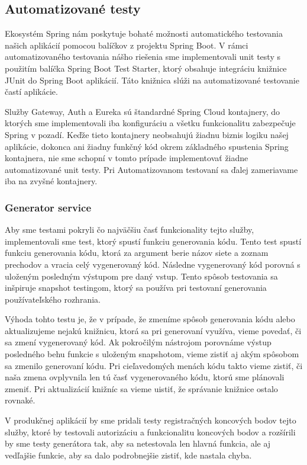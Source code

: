 \subsection{Automatizované testy}

Ekosystém Spring nám poskytuje bohaté možnosti automatického testovania našich aplikácií pomocou balíčkov z projektu Spring Boot. V rámci automatizovaného testovania nášho riešenia sme implementovali unit testy s použitím balíčka Spring Boot Test Starter, ktorý obsahuje integráciu knižnice JUnit do Spring Boot aplikácií. Táto knižnica slúži na automatizované testovanie častí aplikácie. 

Služby Gateway, Auth a Eureka sú štandardné Spring Cloud kontajnery, do ktorých sme implementovali iba konfiguráciu a všetku funkcionalitu zabezpečuje Spring v pozadí. Keďže tieto kontajnery neobsahujú žiadnu biznis logiku našej aplikácie, dokonca ani žiadny funkčný kód okrem základného spustenia Spring kontajnera, nie sme schopní v tomto prípade implementovať žiadne automatizované unit testy. Pri Automatizovanom testovaní sa ďalej zameriavame iba na zvyšné kontajnery.


\subsubsection{Generator service}
Aby sme testami pokryli čo najväčšiu časť funkcionality tejto služby, implementovali sme test, ktorý spustí funkciu generovania kódu. Tento test spustí funkciu generovania kódu, ktorá za argument berie názov siete a zoznam prechodov a vracia celý vygenerovaný kód. Následne vygenerovaný kód porovná s uloženým posledným výstupom pre daný vstup. Tento spôsob testovania sa inšpiruje snapshot testingom, ktorý sa používa pri testovaní generovania používateľského rozhrania. 

Výhoda tohto testu je, že v prípade, že zmeníme spôsob generovania kódu alebo aktualizujeme nejakú knižnicu, ktorá sa pri generovaní využíva, vieme povedať, či sa zmení vygenerovaný kód. Ak pokročilým nástrojom porovnáme výstup posledného behu funkcie s uloženým snapshotom, vieme zistiť aj akým spôsobom sa zmenilo generovaní kódu. 
Pri cieľavedomých menách kódu takto vieme zistiť, či naša zmena ovplyvnila len tú časť vygenerovaného kódu, ktorú sme plánovali zmeniť.
Pri aktualizácií knižníc sa vieme uistiť, že správanie knižnice ostalo rovnaké.

V produkčnej aplikácií by sme pridali testy registračných koncových bodov tejto služby, ktoré by testovali autorizáciu a funkcionalitu koncových bodov a rozšírili by sme testy generátora tak, aby sa netestovala len hlavná funkcia, ale aj vedľajšie funkcie, aby sa dalo podrobnejšie zistiť, kde nastala chyba.


